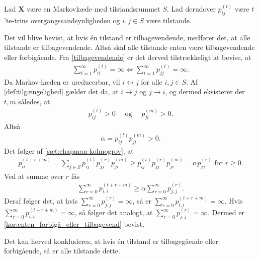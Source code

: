 \begin{bev} \textbf{} %
\newline
Lad $\bm X$ være en Markovkæde med tilstandsrummet $S$. Lad derudover $p_{ij}^{(t)}$ være $t$'te-trins overgangssandsynligheden og $i,j \in S$ være tilstande.

Det vil blive bevist, at hvis én tilstand er tilbagevendende, medfører det, at alle tilstande er tilbagevendende. Altså skal alle tilstande enten være tilbagevendende eller forbigående. Fra \autoref{tilbagevendende} er det derved tilstrækkeligt at bevise, at %
\begin{align*}
    \sum_{t=1}^\infty p_{ii}^{(t)}=\infty \Leftrightarrow  \sum_{t=1}^\infty p_{jj}^{(t)}=\infty.
\end{align*}
%
Da Markov-kæden er ureducerbar, vil $i \leftrightarrow j$ for alle $i,j \in S$. Af \autoref{def:tilgængelighed} gælder det da, at $i \to j$ og $j \to i$, og dermed eksisterer der $t,m$ således, at
\begin{align*}
    p_{ij}^{(t)} > 0 \quad \text{ og } \quad p_{ji}^{(m)} > 0.
\end{align*}
Altså
\begin{align*}
    \alpha = p_{ij}^{(t)}p_{ji}^{(m)} > 0.
\end{align*}
Det følger af \autoref{sæt:chapman-kolmogrov}, at
\begin{align*}
    p_{ii}^{(t+r+m)} = \sum_{j \in S} p_{ij}^{(t)} p_{jj}^{(r)}p_{ji}^{(m)} \geq p_{ij}^{(t)} p_{jj}^{(r)}p_{ji}^{(m)} = \alpha p_{jj}^{(r)} \text{ for } r \geq 0.
\end{align*}
Ved at summe over $r$ fås
\begin{align*}
    \sum_{r=0}^\infty p_{i,i}^{(t+r+m)} \geq \alpha \sum_{r=0}^\infty p_{j,j}^{(r)}.
\end{align*}
Deraf følger det, at hvis $\displaystyle\sum_{r=0}^\infty p_{j,j}^{(r)}= \infty$, så er $\displaystyle\sum_{r=0}^\infty p_{i,i}^{(t+r+m)} = \infty$. Hvis $\displaystyle\sum_{r=0}^\infty p_{i,i}^{(t+r+m)} = \infty$, så følger det analogt, at $\displaystyle\sum_{r=0}^\infty p_{j,j}^{(r)}= \infty$. Dermed er \autoref{kor:enten_forbigå_eller_tilbagevend} bevist.
\end{bev}
Det kan herved konkluderes, at hvis én tilstand er tilbagegående eller forbigående, så er alle tilstande dette.




          




